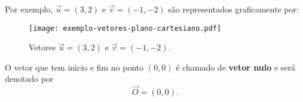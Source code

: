 Por exemplo, $\vec{u} = (3,2)$ e $\vec{v} = (-1,-2)$ s\~ao representados graficamente por:
\begin{figure}[!h]
	\centering
	\caption{Vetores $\vec{u} = (3,2)$ e $\vec{v} = (-1,-2)$.}
	\texttt{[image: exemplo-vetores-plano-cartesiano.pdf]}
\end{figure}

O vetor que tem in{\'\i}cio e fim no ponto $(0,0)$ \'e chamado de \textbf{vetor nulo} e ser\'a denotado por
\[
	\vec{O} = (0,0).
\]

